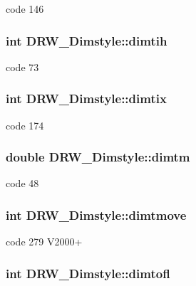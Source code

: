 code 146 \hypertarget{classDRW__Dimstyle_add00c697c40fbc99d7f33af58ac3a75b}{
\subsubsection[{dimtih}]{\setlength{\rightskip}{0pt plus 5cm}int D\-R\-W\-\_\-\-Dimstyle\-::dimtih}}\label{classDRW__Dimstyle_add00c697c40fbc99d7f33af58ac3a75b}
code 73 \hypertarget{classDRW__Dimstyle_a382ba0d93da78f97e93c97ef87edfc62}{
\subsubsection[{dimtix}]{\setlength{\rightskip}{0pt plus 5cm}int D\-R\-W\-\_\-\-Dimstyle\-::dimtix}}\label{classDRW__Dimstyle_a382ba0d93da78f97e93c97ef87edfc62}
code 174 \hypertarget{classDRW__Dimstyle_a80ccee76ee51137e11097fc61bc81329}{
\subsubsection[{dimtm}]{\setlength{\rightskip}{0pt plus 5cm}double D\-R\-W\-\_\-\-Dimstyle\-::dimtm}}\label{classDRW__Dimstyle_a80ccee76ee51137e11097fc61bc81329}
code 48 \hypertarget{classDRW__Dimstyle_a6dfa91db09ae5fa28ea09cb752251a74}{
\subsubsection[{dimtmove}]{\setlength{\rightskip}{0pt plus 5cm}int D\-R\-W\-\_\-\-Dimstyle\-::dimtmove}}\label{classDRW__Dimstyle_a6dfa91db09ae5fa28ea09cb752251a74}
code 279 V2000+ \hypertarget{classDRW__Dimstyle_a23a67180f9fb818301a9a9596818eabb}{
\subsubsection[{dimtofl}]{\setlength{\rightskip}{0pt plus 5cm}int D\-R\-W\-\_\-\-Dimstyle\-::dimtofl}}\label{classDRW__Dimstyle_a23a67180f9fb818301a9a9596818eabb}
